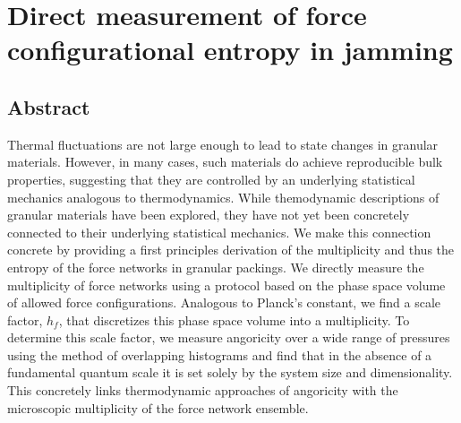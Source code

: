 
\chapter{Direct measurement of force configurational entropy in jamming}
\author{James D Sartor, Eric I Corwin}

\label{forceVolumeEntropyPaper}



\section{Abstract}
Thermal fluctuations are not large enough to lead to state changes in granular materials. However, in many cases, such materials do achieve reproducible bulk properties, suggesting that they are controlled by an underlying statistical mechanics analogous to thermodynamics.
While themodynamic descriptions of granular materials have been explored, they have not yet been concretely connected to their underlying statistical mechanics.
We make this connection concrete by providing a first principles derivation of the multiplicity and thus the entropy of the force networks in granular packings. 
We directly measure the multiplicity of force networks using a protocol based on the phase space volume of allowed force configurations.
Analogous to Planck's constant, we find a scale factor, $h_f$, that discretizes this phase space volume into a multiplicity.
To determine this scale factor, we measure angoricity over a wide range of pressures using the method of overlapping histograms and find that in the absence of a fundamental quantum scale it is set solely by the system size and dimensionality. This concretely links thermodynamic approaches of angoricity with the microscopic multiplicity of the force network ensemble.



